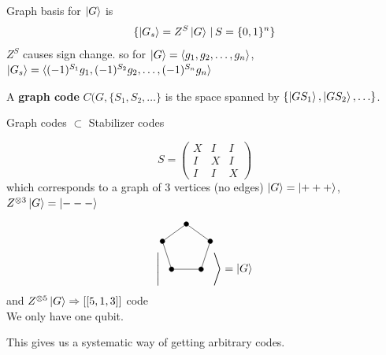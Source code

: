 \begin{definition}
    Graph basis for $\ket{G}$ is \begin{equation}
        \{\ket{G_s}= Z^S \ket{G} \,|\, S = \{0,1\}^n \}
    \end{equation} 
    $Z^S$ causes sign change. so for $\ket{G} = \langle g_1, g_2, \ldots, g_n\rangle$, $\ket{G_s} = \langle (-1)^{S_1}g_1, (-1)^{S_2}g_2, \ldots, (-1)^{S_n}g_n\rangle$
\end{definition}

\begin{definition}
    A \textbf{graph code} $C(G,\{S_1,S_2, \ldots\}$ is the space spanned by $\{\ket{GS_1}, \ket{GS_2}, \ldots\}$. 
\end{definition}

\begin{fact}
    Graph codes $\subset$ Stabilizer codes
\end{fact}

\begin{example}
    \begin{equation}
        S = \begin{pmatrix}
            X&I&I \\ I&X&I \\ I&I&X
        \end{pmatrix}
    \end{equation}
    which corresponds to a graph of 3 vertices (no edges)
    $\ket{G} = \ket{+++}$, $Z^{\otimes 3} \ket{G} = \ket{---}$
\end{example}

\begin{example}
    \begin{equation}
        \Bigg| \begin{tikzpicture}[scale=0.4,
  every node/.style={circle, draw, fill=black, inner sep=1.5pt}
]

\node (n1) at (90:2)  {};
\node (n2) at (18:2)  {};
\node (n3) at (-54:2) {};
\node (n4) at (-126:2){};
\node (n5) at (162:2) {};

\draw (n1)--(n2)--(n3)--(n4)--(n5)--(n1);

\end{tikzpicture} \Bigg\rangle = \ket{G}
    \end{equation} and $Z^{\otimes 5} \ket{G} \Rightarrow [[5,1,3]]$ code \\ We only have one qubit.
\end{example}
This gives us a systematic way of getting arbitrary codes. 

